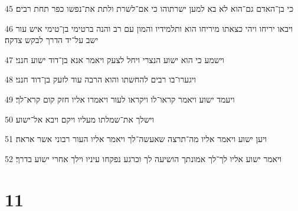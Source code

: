 \par 45 כי בן־האדם גם־הוא לא בא למען ישרתוהו כי אם־לשרת ולתת את־נפשו כפר תחת רבים׃
\par 46 ויבאו יריחו ויהי כצאתו מיריחו הוא ותלמידיו והמון עם רב והנה ברטימי בן־טימי איש עור ישב על־יד הדרך לבקש צדקה׃
\par 47 וישמע כי הוא ישוע הנצרי ויחל לצעק ויאמר אנא בן־דוד ישוע חנני׃
\par 48 ויגערו־בו רבים להחשתו והוא הרבה עוד לזעק בן־דוד חנני׃
\par 49 ויעמד ישוע ויאמר קראו־לו ויקראו לעור ויאמרו אליו חזק קום קרא־לך׃
\par 50 וישלך את־שמלתו מעליו ויקם ויבא אל־ישוע׃
\par 51 ויען ישוע ויאמר אליו מה־תרצה שאעשה־לך ויאמר אליו העור רבוני אשר אראה׃
\par 52 ויאמר ישוע אליו לך־לך אמונתך הושיעה לך וכרגע נפקחו עיניו וילך אחרי ישוע בדרך׃

\chapter{11}

